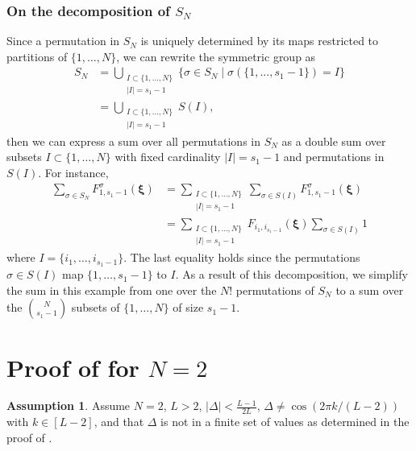 \documentclass[a4paper,11pt]{article}
\theoremstyle{definition}
\newtheorem{assumption}[theorem]{Assumption}
\begin{document}
\subsubsection{On the decomposition of \texorpdfstring{$S_N$}{S	extsubscript{N}}} \label{section: S_N decomp}
Since a permutation in $S_N$ is uniquely determined by its maps restricted to partitions of $\{1,\ldots,N\}$, we can rewrite the symmetric group as \begin{equation}
\begin{split}
    S_N&=\bigcup_{\substack{ I\subset\{1,\ldots,N\}\\
    |I|=s_1-1}
}\{\sigma\in S_N \mid \sigma(\{1,\ldots,s_1-1\})=I\}\\
&=\bigcup_{\substack{
    I\subset\{1,\ldots,N\}\\
    |I|=s_1-1}}S(I),
\end{split}
\end{equation} then we can express a sum over all permutations in $S_N$ as a double sum over subsets $I\subset\{1,\dots,N\}$ with fixed cardinality $|I|=s_1-1$  and permutations in $S(I)$. For instance, 
\begin{equation*}
\begin{split}
    \sum_{\sigma\in S_N}F_{1,s_1-1}^\sigma(\boldsymbol{\xi}) &= \sum_{\substack{
    I\subset\{1,\ldots,N\}\\
    |I|=s_1-1}}\sum_{\sigma\in S(I)} F_{1,s_1-1}^\sigma(\boldsymbol{\xi}) \\
&= \sum_{\substack{
    I\subset\{1,\ldots,N\}\\
    |I|=s_1-1}} F_{i_1,i_{s_1-1}}(\boldsymbol{\xi})\sum_{\sigma\in S(I)}1
\end{split}
\end{equation*}
where $I=\{i_1,\ldots,i_{s_1-1}\}$. The last equality holds since the permutations $\sigma\in S(I)$ map $\{1,\ldots,s_1-1\}$ to $I$. As a result of this decomposition, we simplify the sum in this example from one over the $N!$ permutations of $S_N$ to a sum over the $\binom{N}{s_1-1}$ subsets of $\{1,\ldots,N\}$ of size $s_1-1$.


\section{Proof of \texorpdfstring{}{Conjecture 3.11} for \texorpdfstring{$N=2$}{N=2}}\label{s: N=2 proof}

\begin{assumption}\label{a:N=2 proof assumptions}
    Assume $N=2$, $L>2$, $|\Delta|<\frac{L-1}{2L}$, $\Delta\neq\cos(2\pi k/(L-2))$ with $k\in [L-2]$, and that $\Delta$ is not in a finite set of values as determined in the proof of .
\end{assumption}
\end{document}
